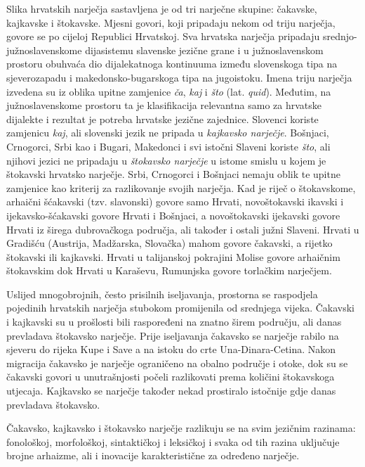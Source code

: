 \begin{multicols}{2}
Slika hrvatskih narječja sastavljena je od tri narječne skupine: čakavske, kajkavske i štokavske. Mjesni govori, koji pripadaju nekom od triju narječja, govore se po cijeloj Republici Hrvatskoj. Sva hrvatska narječja pripadaju srednjo-južnoslavenskome dijasistemu slavenske jezične grane i u južnoslavenskom prostoru obuhvaća dio dijalekatnoga kontinuuma između slovenskoga tipa na sjeverozapadu i makedonsko-bugarskoga tipa na jugoistoku. Imena triju narječja izvedena su iz oblika upitne zamjenice \emph{ča}, \emph{kaj} i \emph{što} (lat. \emph{quid}). Međutim, na južnoslavenskome prostoru ta je klasifikacija relevantna samo za hrvatske dijalekte i rezultat je potreba hrvatske jezične zajednice. Slovenci koriste zamjenicu \emph{kaj}, ali slovenski jezik ne pripada u \emph{kajkavsko narječje}. Bošnjaci, Crnogorci, Srbi kao i Bugari, Makedonci i svi istočni Slaveni koriste \emph{što}, ali njihovi jezici ne pripadaju u \emph{štokavsko narječje} u istome smislu u kojem je štokavski hrvatsko narječje. Srbi, Crnogorci i Bošnjaci nemaju oblik te upitne zamjenice kao kriterij za razlikovanje svojih narječja. Kad je riječ o štokavskome, arhaični šćakavski (tzv. slavonski) govore samo Hrvati, novoštokavski ikavski i ijekavsko-šćakavski govore Hrvati i Bošnjaci, a novoštokavski ijekavski govore Hrvati iz širega dubrovačkoga područja, ali također i ostali južni Slaveni. Hrvati u Gradišću (Austrija, Madžarska, Slovačka) mahom govore čakavski, a rijetko štokavski ili kajkavski. Hrvati u talijanskoj pokrajini Molise govore arhaičnim štokavskim dok Hrvati u Karaševu, Rumunjska govore torlačkim narječjem.
 
Uslijed mnogobrojnih, često prisilnih iseljavanja, prostorna se raspodjela pojedinih hrvatskih narječja stubokom promijenila od srednjega vijeka. Čakavski i kajkavski su u prošlosti bili raspoređeni na znatno širem području, ali danas prevladava štokavsko narječje. Prije iseljavanja čakavsko se narječje rabilo na sjeveru do rijeka Kupe i Save a na istoku do crte Una-Dinara-Cetina. Nakon migracija čakavsko je narječje ograničeno na obalno područje i otoke, dok su se čakavski govori u unutrašnjosti počeli razlikovati prema količini štokavskoga utjecaja. Kajkavsko se narječje također nekad prostiralo istočnije gdje danas prevladava štokavsko.

Čakavsko, kajkavsko i štokavsko narječje razlikuju se na svim jezičnim razinama: fonološkoj, morfološkoj, sintaktičkoj i leksičkoj i svaka od tih razina uključuje brojne arhaizme, ali i inovacije karakteristične za određeno narječje.


\end{multicols}
